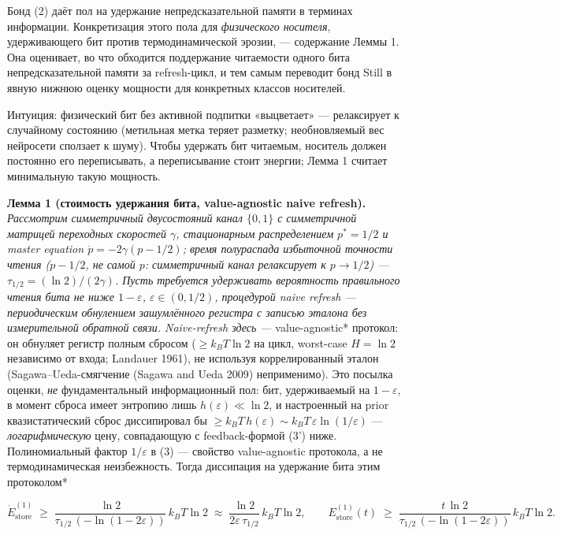 \documentclass[pdflatex,sn-mathphys-ay]{sn-jnl}
\begin{document}
Бонд (2) даёт пол на удержание непредсказательной памяти в терминах информации. Конкретизация этого пола для \emph{физического носителя}, удерживающего бит против термодинамической эрозии, --- содержание Леммы 1. Она оценивает, во что обходится поддержание читаемости одного бита непредсказательной памяти за refresh-цикл, и тем самым переводит бонд Still в явную нижнюю оценку мощности для конкретных классов носителей.



Интуиция: физический бит без активной подпитки «выцветает» --- релаксирует к случайному состоянию (метильная метка теряет разметку; необновляемый вес нейросети сползает к шуму). Чтобы удержать бит читаемым, носитель должен постоянно его переписывать, а переписывание стоит энергии; Лемма 1 считает минимальную такую мощность.



\textbf{Лемма 1 (стоимость удержания бита, value-agnostic naive refresh).} \emph{Рассмотрим симметричный двусостояний канал \(\{0,1\}\) с симметричной матрицей переходных скоростей \(\gamma\), стационарным распределением \(p^* = 1/2\) и master equation \(\dot p = -2\gamma(p - 1/2)\); время полураспада избыточной точности чтения (\(p - 1/2\), не самой \(p\): симметричный канал релаксирует к \(p \to 1/2\)) --- \(\tau_{1/2} = (\ln 2)/(2\gamma)\). Пусть требуется удерживать вероятность правильного чтения бита не ниже \(1 - \varepsilon\), \(\varepsilon \in (0, 1/2)\), процедурой naive refresh --- периодическим обнулением зашумлённого регистра с записью эталона без измерительной обратной связи. Naive-refresh здесь --- }value-agnostic* протокол: он обнуляет регистр полным сбросом (\(\ge k_B T \ln 2\) на цикл, worst-case \(H = \ln 2\) независимо от входа; Landauer 1961), не используя коррелированный эталон (Sagawa--Ueda-смягчение (Sagawa and Ueda 2009) неприменимо). Это посылка оценки, \emph{не} фундаментальный информационный пол: бит, удерживаемый на \(1-\varepsilon\), в момент сброса имеет энтропию лишь \(h(\varepsilon) \ll \ln 2\), и настроенный на prior квазистатический сброс диссипировал бы \(\ge k_B T\, h(\varepsilon) \sim k_B T\,\varepsilon\ln(1/\varepsilon)\) --- \emph{логарифмическую} цену, совпадающую с feedback-формой (3') ниже. Полиномиальный фактор \(1/\varepsilon\) в (3) --- свойство value-agnostic протокола, а не термодинамическая неизбежность. Тогда диссипация на удержание бита этим протоколом*



\begin{equation}\dot E_{\text{store}}^{(1)} \;\ge\; \frac{\ln 2}{\tau_{1/2}\,(-\ln(1 - 2\varepsilon))}\, k_B T \ln 2 \;\approx\; \frac{\ln 2}{2\varepsilon\, \tau_{1/2}}\, k_B T \ln 2, \qquad E_{\text{store}}^{(1)}(t) \;\ge\; \frac{t\, \ln 2}{\tau_{1/2}\,(-\ln(1 - 2\varepsilon))}\, k_B T \ln 2. \tag{3}\end{equation}
\end{document}

